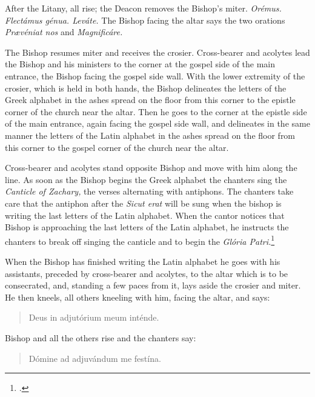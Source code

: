 \documentclass[letterpaper]{report}
\begin{document}
{    \rubric After the Litany, all rise; the Deacon removes the Bishop's miter.
    \textit{Or\'emus. Flectámus génua. Leváte.} The Bishop facing the altar
    says the two orations \textit{Pr\ae véniat nos} and \textit{Magnificáre.}

    \rubric The Bishop resumes miter and receives the crosier. Cross-bearer and
    acolytes lead the Bishop and his ministers to the corner at the gospel side
    of the main entrance, the Bishop facing the gospel side wall. With the
    lower extremity of the crosier, which is held in both hands, the Bishop
    delineates the letters of the Greek alphabet in the ashes spread on the
    floor from this corner to the epistle corner of the church near the altar.
    Then he goes to the corner at the epistle side of the main entrance, again
    facing the gospel side wall, and delineates in the same manner the letters
    of the Latin alphabet in the ashes spread on the floor from this corner to
    the gospel corner of the church near the altar.

    \rubric Cross-bearer and acolytes stand opposite Bishop and move with him
    along the line. As soon as the Bishop begins the Greek alphabet the
    chanters sing the \textit{Canticle of Zachary,} the verses alternating with
    antiphons. The chanters take care that the antiphon after the \textit{Sicut
    erat} will be sung when the bishop is writing the last letters of the Latin
    alphabet. When the cantor notices that Bishop is approaching the last
    letters of the Latin alphabet, he instructs the chanters to break off
    singing the canticle and to begin the \textit{Gl\'oria
    Patri.}\footcite[][p. 56.]{consecranda}

    \rubric When the Bishop has finished writing the Latin alphabet he goes
    with his assistants, preceded by cross-bearer and acolytes, to the altar
    which is to be consecrated, and, standing a few paces from it, lays aside
    the crosier and miter. He then kneels, all others kneeling with him, facing
    the altar, and says:

    \begin{quote}
        \vbar Deus in adjutórium meum inténde.
    \end{quote}

    Bishop and all the others rise and the chanters say:

    \begin{quote}
        \rbar Dómine ad adjuvándum me festína.
    \end{quote}

}
\end{document}
